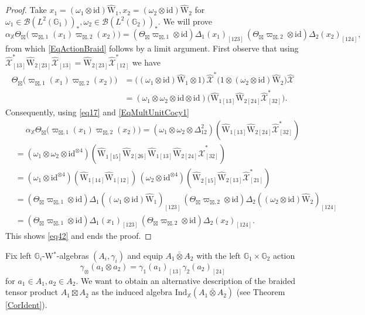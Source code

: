 \documentclass[reqno]{amsart}
\numberwithin{equation}{section}
\newcommand{\mcB}{\mathcal{B}}
\newcommand{\id}{\mathrm{id}}
\newcommand{\G}{\mathbb{G}}
\newcommand{\X}{\mathbb{X}}
\newcommand{\Ind}{\mathrm{Ind}}
\newcommand{\ov}{\overline}
\newcommand{\mc}{\mathcal}
\newcommand{\wh}{\widehat}
\newcommand{\GG}{\mathbb{G}}
\newcommand{\ww}{\mathrm{W}}
\begin{document}
\begin{proof}
Take $x_1=(\omega_1\otimes\id)\hat{\ww}_{1}, x_2=(\omega_2\otimes\id)\hat{\ww}_2$ for $\omega_1\in \mcB(L^2(\GG_1))_*,\omega_2\in \mcB(L^2(\GG_2))_*$. We will prove
\begin{equation}\label{eq42}
\alpha_{\X}\Theta_{\boxtimes}\bigl(
\varpi_{\boxtimes,1}(x_1) \varpi_{\boxtimes,2}(x_2)\bigr)
= (\Theta_{\boxtimes}\varpi_{\boxtimes,1}\otimes \id)\Delta_1(x_1)_{[123]}\,
(\Theta_{\boxtimes}\varpi_{\boxtimes,2}\otimes \id)\Delta_2(x_2)_{[124]},
\end{equation}
from which \eqref{EqActionBraid} follows by a limit argument. First observe that using $\wh{\mc{X}}^*_{[13]} \hat{\ww}_{2[23]} \wh{\mc{X}}_{[13]}=\hat{\ww}_{2[23]}\wh{\mc{X}}^*_{[12]}$ we have
\[\begin{split}
\Theta_{\boxtimes}\bigl(
\varpi_{\boxtimes,1}(x_1) \varpi_{\boxtimes,2}(x_2)\bigr)&=
\bigl( (\omega_1\otimes\id)\hat{\ww}_1\otimes 1\bigr)\,
\wh{\mc{X}}^* \bigl(1\otimes (\omega_2\otimes\id)\hat{\ww}_2\bigr)\wh{\mc{X}}\\
&=
(\omega_1\otimes\omega_2\otimes\id\otimes\id)
\bigl(
\hat{\ww}_{1 [13]} \hat{\ww}_{2[24]} \wh{\mc{X}}^*_{[32]}\bigr).
\end{split}\]
Consequently, using \eqref{eq17} and \eqref{EqMultUnitCocy1}
\[\begin{split}
&\quad\;
\alpha_{\X}\Theta_{\boxtimes} \bigl(
\varpi_{\boxtimes,1}(x_1) \varpi_{\boxtimes,2}(x_2)\bigr)=
(\omega_1\otimes\omega_2\otimes\Delta_{12}^{2})(
\hat{\ww}_{1[13]} \hat{\ww}_{2[24]} \wh{\mc{X}}^*_{[32]})\\
&=
(\omega_1\otimes\omega_2\otimes\id^{\otimes 4})(
\hat{\ww}_{1[15]}\hat{\ww}_{2[26]}
\hat{\ww}_{1[13]}\hat{\ww}_{2[24]}
\wh{\mc{X}}^*_{[32]}
)\\
&=
(\omega_1\otimes \id^{\otimes 4})
(\hat{\ww}_{1[14]}\hat{\ww}_{1[12]})
\,
(\omega_2\otimes \id^{\otimes 4})
(\hat{\ww}_{2[15]} \hat{\ww}_{2[13]} \wh{\mc{X}}^*_{[21]})\\
&=
(\Theta_{\boxtimes}\varpi_{\boxtimes,1}\otimes \id)
\Delta_1( (\omega_1\otimes \id)\hat{\ww}_1)_{[123]}\,
(\Theta_{\boxtimes}\varpi_{\boxtimes,2}\otimes \id)
\Delta_2( (\omega_2\otimes \id)\hat{\ww}_2)_{[124]}\\
&=
(\Theta_{\boxtimes}\varpi_{\boxtimes,1}\otimes \id)
\Delta_1( x_1)_{[123]}\,
(\Theta_{\boxtimes}\varpi_{\boxtimes,2}\otimes \id)
\Delta_2( x_2)_{[124]}.
\end{split}\]
This shows \eqref{eq42} and ends the proof.
\end{proof}

Fix left $\G_i$-W$^*$-algebras $(A_i,\gamma_i)$ and equip $A_1\bar\otimes A_2$ with the left $\GG_1\times \GG_2$ action  
\[
\gamma_{\otimes}(a_1\otimes a_2) = \gamma_1(a_1)_{[13]}\gamma_2(a_2)_{[24]}
\] 
for $a_1\in A_1,a_2\in A_2$. We want to obtain an alternative description of the braided tensor product $A_1\ov\boxtimes A_2$ as the induced algebra $\Ind_{\X}(A_1\bar\otimes A_2)$ (see Theorem \ref{CorIdent}).
\end{document}
